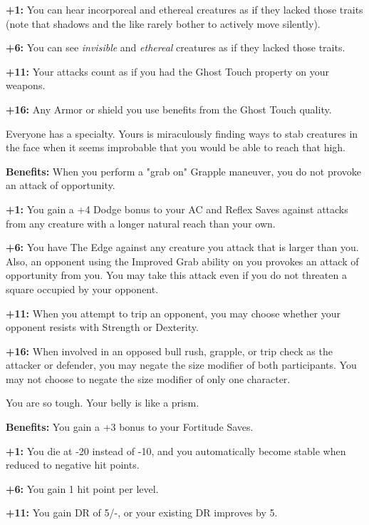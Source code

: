 \textbf{+1:} You can hear incorporeal and ethereal creatures as if they lacked those traits (note that shadows and the like rarely bother to actively move silently).

\textbf{+6:} You can see \textit{invisible} and \textit{ethereal} creatures as if they lacked those traits.

\textbf{+11:} Your attacks count as if you had the Ghost Touch property on your weapons.

\textbf{+16:} Any Armor or shield you use benefits from the Ghost Touch quality.


Everyone has a specialty. Yours is miraculously finding ways to stab creatures in the face when it seems improbable that you would be able to reach that high.

\textbf{Benefits:} When you perform a "grab on" Grapple maneuver, you do not provoke an attack of opportunity.

\textbf{+1:} You gain a +4 Dodge bonus to your AC and Reflex Saves against attacks from any creature with a longer natural reach than your own.

\textbf{+6:} You have The Edge against any creature you attack that is larger than you. Also, an opponent using the Improved Grab ability on you provokes an attack of opportunity from you. You may take this attack even if you do not threaten a square occupied by your opponent.

\textbf{+11:} When you attempt to trip an opponent, you may choose whether your opponent resists with Strength or Dexterity.

\textbf{+16:} When involved in an opposed bull rush, grapple, or trip check as the attacker or defender, you may negate the size modifier of both participants. You may not choose to negate the size modifier of only one character.


You are so tough. Your belly is like a prism.

\textbf{Benefits:} You gain a +3 bonus to your Fortitude Saves.

\textbf{+1:} You die at -20 instead of -10, and you automatically become stable when reduced to negative hit points.

\textbf{+6:} You gain 1 hit point per level.

\textbf{+11:} You gain DR of 5/-, or your existing DR improves by 5.

